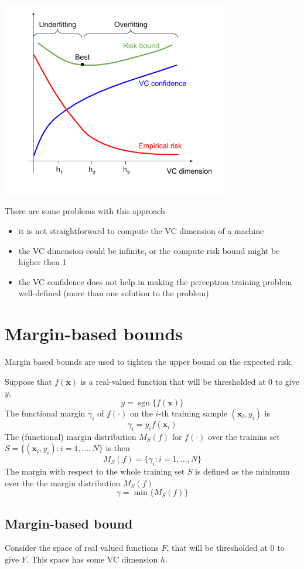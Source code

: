 \documentclass[oneside,onecolumn]{report}
\DeclareMathOperator*{\sgn}{sgn}
\begin{document}
\begin{center}
    \includegraphics[width=10cm]{structural_risk_minimzation.png}
\end{center}

There are some problems with this approach
\begin{itemize}
    \item it is not straightforward to compute the VC dimension of a machine
    \item the VC dimension could be infinite, or the compute risk bound might be higher then 1
    \item the VC confidence does not help in making the perceptron training problem well-defined (more than one solution to the problem)
\end{itemize}


\section{Margin-based bounds}
Margin based bounds are used to tighten the upper bound on the expected risk.

Suppose that $f(\bm x)$ is a real-valued function that will be thresholded at 0 to give $y$,
$$ y = \sgn\{f(\bm x)\} $$
The functional margin $\gamma_i$ of $f(\cdot)$ on the $i$-th training sample $(\bm x_i, y_i)$ is
$$ \gamma_i = y_i f(\bm x_i) $$
The (functional) margin distribution $M_S(f)$ for $f(\cdot)$ over the trainins set $S = \{ (\bm x_i, y_i) : i = 1, \dots, N \}$ is then
$$ M_S(f) = \{ \gamma_i : i = 1, \dots, N \} $$
The margin with respect to the whole training set $S$ is defined as the minimum over the the margin distribution $M_S(f)$
$$ \gamma = \min\{ M_S(f) \} $$

\subsection{Margin-based bound}
Consider the space of real valued functions $F$, that will be thresholded at 0 to give $Y$.
This space has some VC dimension $h$.
\end{document}
